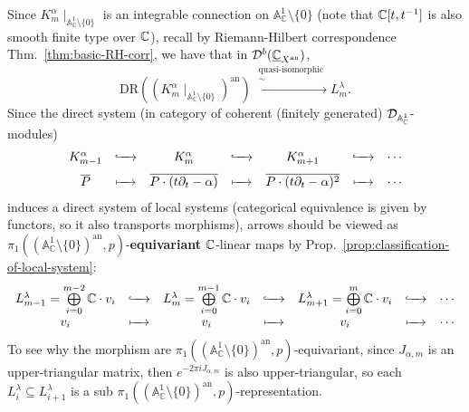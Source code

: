 \bigskip

Since $K^\alpha_m\mid_{\mathbb{A}_{\mathbb{C}}^1 \setminus \{0\}}$ is an integrable connection on $\mathbb{A}_{\mathbb{C}}^1 \setminus \{0\}$ (note that $\mathbb{C}[t, t^{-1}]$ is also smooth finite type over $\mathbb{C}$), recall by Riemann-Hilbert correspondence Thm.~\ref{thm:basic-RH-corr}, we have \cite[Thm.~7.2.1]{hotta2008d} that in $\mathcal{D}^b(\underline{\mathbb{C}}_{X^\mathrm{an}})$,
$$
    \text{DR}\left((K_m^{\alpha}\mid_{\mathbb{A}_{\mathbb{C}}^1 \setminus \{0\}})^{\mathrm{an}}\right) \xrightarrow{\substack{\text{quasi-isomorphic}\\ \sim}}  L_m^{\lambda}.
$$
Since the direct system (in category of coherent (finitely generated) $\mathcal{D}_{\mathbb{A}_{\mathbb{C}}^1}$-modules)
\begin{equation*}
    \begin{array}{ccccccc}
        K_{m-1}^{\alpha} & \lhook\joinrel\xrightarrow{\quad} & K_m^{\alpha}                              & \lhook\joinrel\xrightarrow{\quad} & K_{m+1}^{\alpha}                            & \lhook\joinrel\xrightarrow{\quad} & \cdots \\[1.5ex]
        \overline P      & \xmapsto{\quad}                   & \overline{P \cdot (t\partial_t - \alpha)} & \xmapsto{\quad}                   & \overline{P \cdot (t\partial_t - \alpha)^2} & \xmapsto{\quad}                   & \cdots
    \end{array}
\end{equation*}
induces a direct system of local systems
(categorical equivalence is given by functors, so it also transports morphisms),
arrows should be viewed as $\pi_1((\mathbb{A}_{\mathbb{C}}^1 \setminus \{0\})^\mathrm{an}, p)$-\textbf{equivariant} $\mathbb{C}$-linear maps by Prop.~\ref{prop:classification-of-local-system}:
\begin{equation*}
    \begin{array}{ccccccc}
        L_{m-1}^{\lambda}=\bigoplus \limits_{i=0}^{m-2}\C\cdot v_i & \lhook\joinrel\xrightarrow{\quad} & L_m^{\lambda}=\bigoplus \limits_{i=0}^{m-1}\C\cdot v_i & \lhook\joinrel\xrightarrow{\quad} & L_{m+1}^{\lambda}=\bigoplus \limits_{i=0}^{m}\C\cdot v_i & \lhook\joinrel\xrightarrow{\quad} & \cdots \\[1.5ex]
        v_i                                                        & \xmapsto{\quad}                   & v_i                                                    & \xmapsto{\quad}                   & v_i                                                      & \xmapsto{\quad}                   & \cdots
    \end{array}
\end{equation*}
To see why the morphism are $\pi_1((\mathbb{A}_{\mathbb{C}}^1 \setminus \{0\})^\mathrm{an}, p)$-equivariant,
since $J_{\alpha, m}$ is an upper-triangular matrix, then $e^{-2\pi iJ_{\alpha,m}}$ is also upper-triangular, so each $L^\lambda_{i}\subseteq L^\lambda_{i+1}$ is a sub $\pi_1((\mathbb{A}_{\mathbb{C}}^1 \setminus \{0\})^\mathrm{an}, p)$-representation.

